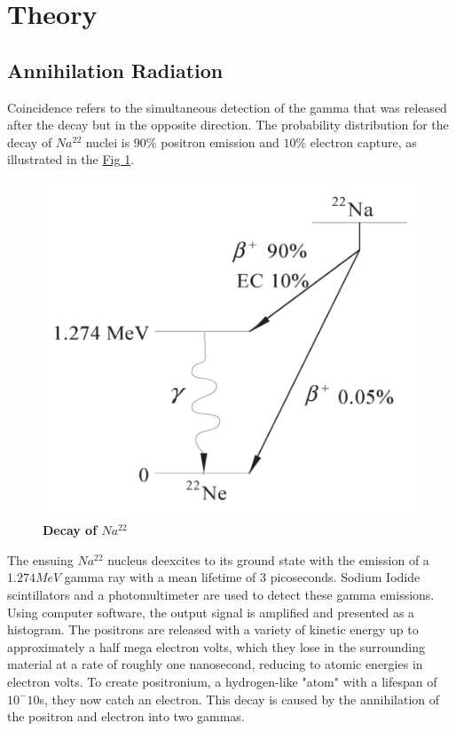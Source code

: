 \section{Theory}

	\subsection{Annihilation Radiation}
		Coincidence refers to the simultaneous detection of the gamma that was released after the decay but in the opposite direction. The probability distribution for the decay of $Na^{22}$ nuclei is $90\%$ positron emission and $10\%$ electron capture, as illustrated in the \hyperref[fig:1]{Fig 1}.
		\begin{figure}[h]
			\centering
			\includegraphics[width=0.8\columnwidth]{images/theory1.png}
			\caption{\textbf{Decay of $Na^{22}$}}
			\label{fig:1}
		\end{figure}

		The ensuing $Na^{22}$ nucleus deexcites to its ground state with the emission of a $1.274 MeV$ gamma ray with a mean lifetime of 3 picoseconds. Sodium Iodide scintillators and a photomultimeter are used to detect these gamma emissions. Using computer software, the output signal is amplified and presented as a histogram. The positrons are released with a variety of kinetic energy up to approximately a half mega electron volts, which they lose in the surrounding material at a rate of roughly one nanosecond, reducing to atomic energies in electron volts. To create positronium, a hydrogen-like "atom" with a lifespan of $10^-{10}$s, they now catch an electron. This decay is caused by the annihilation of the positron and electron into two gammas.

